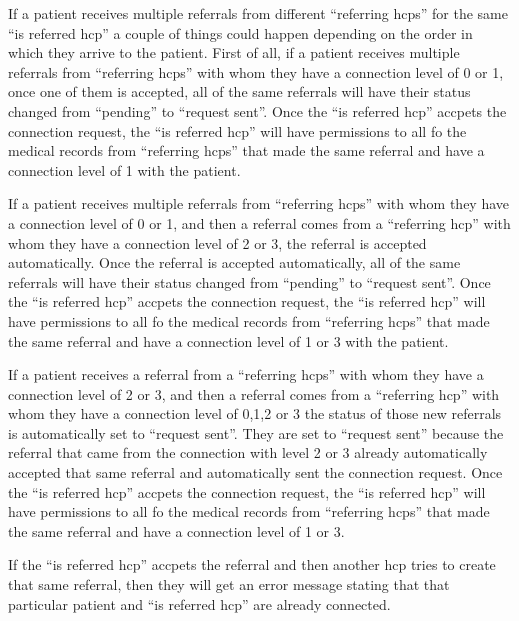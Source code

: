 If a patient receives multiple referrals from different ``referring hcps'' for the same ``is referred hcp'' a couple of things could happen depending on the order in which they arrive to the patient. First of all, if a patient receives multiple referrals from ``referring hcps'' with whom they have a connection level of 0 or 1, once one of them is accepted, all of the same referrals will have their status changed from ``pending'' to ``request sent''.  Once the ``is referred hcp'' accpets the connection request, the ``is referred hcp'' will have permissions to all fo the medical records from ``referring hcps'' that made the same referral and have a connection level of 1 with the patient.

If a patient receives multiple referrals from ``referring hcps'' with whom they have a connection level of 0 or 1, and then a referral comes from a ``referring hcp'' with whom they have a connection level of 2 or 3, the referral is accepted automatically.  Once the referral is accepted automatically, all of the same referrals will have their status changed from ``pending'' to ``request sent''.  Once the ``is referred hcp'' accpets the connection request, the ``is referred hcp'' will have permissions to all fo the medical records from ``referring hcps'' that made the same referral and have a connection level of 1 or 3 with the patient.

If a patient receives a referral from a ``referring hcps'' with whom they have a connection level of 2 or 3, and then a referral comes from a ``referring hcp'' with whom they have a connection level of 0,1,2 or 3 the status of those new referrals is automatically set to ``request sent''.  They are set to ``request sent'' because the referral that came from the connection with level 2 or 3 already automatically accepted that same referral and automatically sent the connection request.  Once the ``is referred hcp'' accpets the connection request, the ``is referred hcp'' will have permissions to all fo the medical records from ``referring hcps'' that made the same referral and have a connection level of 1 or 3.

If the ``is referred hcp'' accpets the referral and then another hcp tries to create that same referral, then they will get an error message stating that that particular patient and ``is referred hcp'' are already connected.
